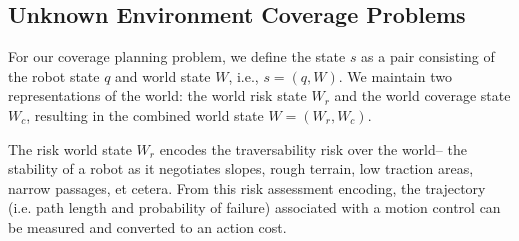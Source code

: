 \documentclass[letterpaper]{article} %
\newcommand{\ph}[1]{{\textbf{#1}:}} %
\newcommand{\phdone}[1]{} %
\begin{document}
\subsection{Unknown Environment Coverage Problems}

\phdone{Coverage Problem}
For our coverage planning problem, we define the state $s$ as a pair consisting of the robot state $q$ and world state $W$, i.e., $s = (q, W)$.
We maintain two representations of the world: the world risk state $W_{r}$ and the world coverage state $W_{c}$, resulting in the combined world state $W = (W_{r}, W_{c})$.





The risk world state $W_{r}$ encodes the traversability risk over the world-- the stability of a robot as it negotiates slopes, rough terrain, low traction areas, narrow passages, et cetera. From this risk assessment encoding, the trajectory (i.e. path length and probability of failure) associated with a motion control can be measured and converted to an action cost.  
\end{document}
